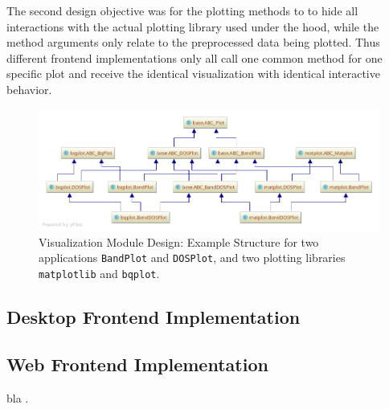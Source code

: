 The second design objective was for the plotting methods to to hide all
interactions with the actual plotting library used under the hood, while the
method arguments only relate to the preprocessed data being plotted. Thus
different frontend implementations only all call one common method for one
specific plot and receive the identical visualization with identical interactive
behavior.

\begin{figure}[htb!]
    \centering
    \includegraphics[width=1.0\linewidth]{img/pycharm_uml/matplot.png}
    \caption{Visualization Module Design: Example Structure for two applications
    \texttt{BandPlot} and \texttt{DOSPlot}, and two plotting libraries
    \texttt{matplotlib} and \texttt{bqplot}.}
    \label{fig:visualization-module}
\end{figure}

\subsection{Desktop Frontend Implementation}
\label{sec:desktop-frontend}

\subsection{Web Frontend Implementation}
\label{sec:web-frontend}

bla \cite{jw-notes}.





